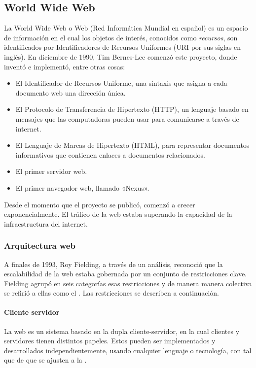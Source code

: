 \subsection{World Wide Web}
\label{\detokenize{chapter_one/rest:world-wide-web}}
La World Wide Web o Web (Red Informática Mundial en español)  es un espacio de
información en el cual los objetos de interés, conocidos como \textit{recursos},
son identificados por Identificadores de Recursos Uniformes (URI por sus
siglas en inglés). En diciembre de 1990, Tim Bernes-Lee comenzó este proyecto,
donde inventó e implementó, entre otras cosas:
\begin{itemize}
\item {} 
El Identificador de Recursos Uniforme, una sintaxis que asigna a cada documento web una dirección única.

\item {} 
El Protocolo de Transferencia de Hipertexto (HTTP), un lenguaje basado en mensajes que las computadoras pueden usar para comunicarse a través de internet.

\item {} 
El Lenguaje de Marcas de Hipertexto (HTML), para representar documentos informativos que contienen enlaces a documentos relacionados.

\item {} 
El primer servidor web.

\item {} 
El primer navegador web, llamado «Nexus».

\end{itemize}

Desde el momento que el proyecto se publicó, comenzó a crecer exponencialmente.
El tráfico de la web estaba superando la capacidad de la infraestructura del internet.


\subsubsection{Arquitectura web}
\label{\detokenize{chapter_one/rest:arquitectura-web}}
A finales de 1993, Roy Fielding, a través de un análisis, reconoció que la escalabilidad
de la web estaba gobernada por un conjunto de restricciones clave.
Fielding agrupó en seis categorías esas restricciones y de manera manera colectiva
se refirió a ellas como el . Las
restricciones se describen a continuación.


\paragraph{Cliente servidor}
\label{\detokenize{chapter_one/rest:cliente-servidor}}
La web es un sistema basado en la dupla cliente-servidor, en la cual clientes y servidores
tienen distintos papeles. Estos pueden ser implementados y desarrollados independientemente,
usando cualquier lenguaje o tecnología, con tal que de que se ajusten a la .


